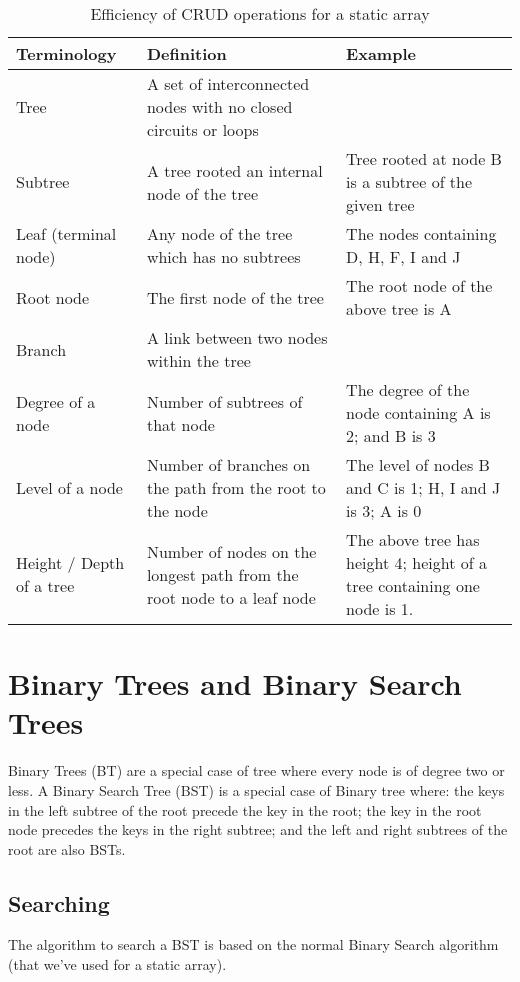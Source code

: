 \begin{table}[H]
    \centering
    {\RaggedRight
    \begin{tabular}{p{}p{}p{}}
    \textbf{Terminology} & \textbf{Definition} & \textbf{Example}\\
    \hline
    \hline
    Tree & A set of interconnected nodes with no closed circuits or loops & \\
    \hline
    Subtree & A tree rooted an internal node of the tree & Tree rooted at node B is a subtree of the given tree\\
    \hline
    Leaf (terminal node) & Any node of the tree which has no subtrees & The nodes containing D, H, F, I and J\\
    \hline
    Root node & The first node of the tree & The root node of the above tree is A\\
    \hline
    Branch & A link between two nodes within the tree & \\
    \hline
    Degree of a node & Number of subtrees of that node & The degree of the node containing A is 2; and B is 3\\
    \hline
    Level of a node & Number of branches on the path from the root to the node & The level of nodes B and C is 1; H, I and J is 3; A is 0\\
    \hline
    Height / Depth of a tree & Number of nodes on the longest path from the root node to a leaf node & The above tree has height 4; height of a tree containing one node is 1.\\
    \hline
    \end{tabular}
    } %
    \caption{Efficiency of CRUD operations for a static array}
\end{table}

\section{Binary Trees and Binary Search Trees}
Binary Trees (BT) are a special case of tree where every node is of degree two or less. A Binary Search Tree (BST) is a special case of Binary tree where: the keys in the left subtree of the root precede the key in the root; the key in the root node precedes the keys in the right subtree; and the left and right subtrees of the root are also BSTs. 

\subsection{Searching}
The algorithm to search a BST is based on the normal Binary Search algorithm (that we’ve used for a static array).\\

